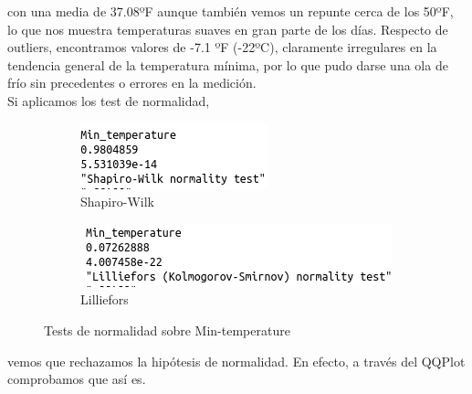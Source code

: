 con una media de 37.08ºF aunque también vemos un repunte cerca de los 50ºF, lo que nos muestra temperaturas suaves en gran parte de los días. Respecto de outliers, encontramos valores de -7.1 ºF (-22ºC), claramente irregulares en la tendencia general de la temperatura mínima, por lo que pudo darse una ola de frío sin precedentes o errores en la medición.\\
Si aplicamos los test de normalidad,

\begin{figure}[H]
	\centering
	\begin{subfigure}{.5\textwidth}
		\centering
		\includegraphics[width=.7\linewidth]{shapiro-min-temp.png}
		\caption{Shapiro-Wilk}
		\label{fig:sw-min-temp}
	\end{subfigure}%
	\begin{subfigure}{.5\textwidth}
		\centering
		\includegraphics[width=.7\linewidth]{lillie-min-temp.png}	\caption{Lilliefors}
		\label{fig:l-min-temp}
	\end{subfigure}
	\caption{Tests de normalidad sobre Min-temperature}
	\label{fig:norm-min-temp}
\end{figure}

vemos que rechazamos la hipótesis de normalidad. En efecto, a través del QQPlot comprobamos que así es.

